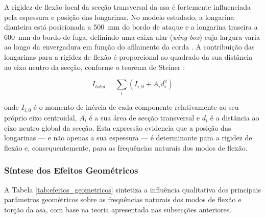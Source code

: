 \documentclass[a4paper,fleqn]{cas-sc}
\begin{document}
A rigidez de flexão local da secção transversal da asa é fortemente influenciada pela espessura e posição das longarinas. No modelo estudado, a longarina dianteira está posicionada a \SI{500}{\milli\meter} do bordo de ataque e a longarina traseira a \SI{600}{\milli\meter} do bordo de fuga, definindo uma caixa alar (\textit{wing box}) cuja largura varia ao longo da envergadura em função do afilamento da corda \cite{Megson2012}. A contribuição das longarinas para a rigidez de flexão é proporcional ao quadrado da sua distância ao eixo neutro da secção, conforme o teorema de Steiner \cite{Rao2011}:

\begin{equation}
    I_{total} = \sum_i \left( I_{i,0} + A_i d_i^2 \right)
    \label{eq:steiner}
\end{equation}

\noindent onde $I_{i,0}$ é o momento de inércia de cada componente relativamente ao seu próprio eixo centroidal, $A_i$ é a sua área de secção transversal e $d_i$ é a distância ao eixo neutro global da secção. Esta expressão evidencia que a posição das longarinas --- e não apenas a sua espessura --- é determinante para a rigidez de flexão e, consequentemente, para as frequências naturais dos modos de flexão.

\subsubsection{Síntese dos Efeitos Geométricos}

A Tabela \ref{tab:efeitos_geometricos} sintetiza a influência qualitativa dos principais parâmetros geométricos sobre as frequências naturais dos modos de flexão e torção da asa, com base na teoria apresentada nas subsecções anteriores.
\end{document}
